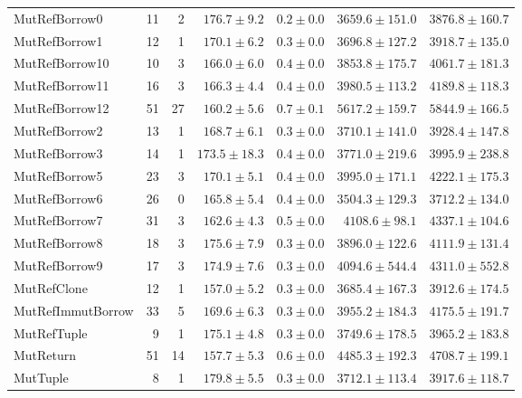 \begin{table}
\begin{tabular}{lrrrrrr}
MutRefBorrow0            &   11 &    2 &      $176.7\pm9.2$ &  $0.2\pm0.0$ &   $3659.6\pm151.0$ &   $3876.8\pm160.7$ \\
MutRefBorrow1            &   12 &    1 &      $170.1\pm6.2$ &  $0.3\pm0.0$ &   $3696.8\pm127.2$ &   $3918.7\pm135.0$ \\
MutRefBorrow10           &   10 &    3 &      $166.0\pm6.0$ &  $0.4\pm0.0$ &   $3853.8\pm175.7$ &   $4061.7\pm181.3$ \\
MutRefBorrow11           &   16 &    3 &      $166.3\pm4.4$ &  $0.4\pm0.0$ &   $3980.5\pm113.2$ &   $4189.8\pm118.3$ \\
MutRefBorrow12           &   51 &   27 &      $160.2\pm5.6$ &  $0.7\pm0.1$ &   $5617.2\pm159.7$ &   $5844.9\pm166.5$ \\
MutRefBorrow2            &   13 &    1 &      $168.7\pm6.1$ &  $0.3\pm0.0$ &   $3710.1\pm141.0$ &   $3928.4\pm147.8$ \\
MutRefBorrow3            &   14 &    1 &     $173.5\pm18.3$ &  $0.4\pm0.0$ &   $3771.0\pm219.6$ &   $3995.9\pm238.8$ \\
MutRefBorrow5            &   23 &    3 &      $170.1\pm5.1$ &  $0.4\pm0.0$ &   $3995.0\pm171.1$ &   $4222.1\pm175.3$ \\
MutRefBorrow6            &   26 &    0 &      $165.8\pm5.4$ &  $0.4\pm0.0$ &   $3504.3\pm129.3$ &   $3712.2\pm134.0$ \\
MutRefBorrow7            &   31 &    3 &      $162.6\pm4.3$ &  $0.5\pm0.0$ &    $4108.6\pm98.1$ &   $4337.1\pm104.6$ \\
MutRefBorrow8            &   18 &    3 &      $175.6\pm7.9$ &  $0.3\pm0.0$ &   $3896.0\pm122.6$ &   $4111.9\pm131.4$ \\
MutRefBorrow9            &   17 &    3 &      $174.9\pm7.6$ &  $0.3\pm0.0$ &   $4094.6\pm544.4$ &   $4311.0\pm552.8$ \\
MutRefClone              &   12 &    1 &      $157.0\pm5.2$ &  $0.3\pm0.0$ &   $3685.4\pm167.3$ &   $3912.6\pm174.5$ \\
MutRefImmutBorrow        &   33 &    5 &      $169.6\pm6.3$ &  $0.3\pm0.0$ &   $3955.2\pm184.3$ &   $4175.5\pm191.7$ \\
MutRefTuple              &    9 &    1 &      $175.1\pm4.8$ &  $0.3\pm0.0$ &   $3749.6\pm178.5$ &   $3965.2\pm183.8$ \\
MutReturn                &   51 &   14 &      $157.7\pm5.3$ &  $0.6\pm0.0$ &   $4485.3\pm192.3$ &   $4708.7\pm199.1$ \\
MutTuple                 &    8 &    1 &      $179.8\pm5.5$ &  $0.3\pm0.0$ &   $3712.1\pm113.4$ &   $3917.6\pm118.7$ \\

\end{tabular}
\end{table}
